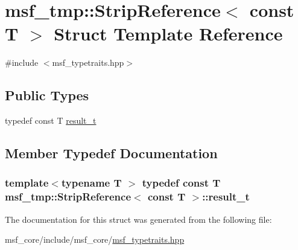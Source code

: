 \hypertarget{structmsf__tmp_1_1StripReference_3_01const_01T_01_4}{\section{msf\-\_\-tmp\-:\-:Strip\-Reference$<$ const T $>$ Struct Template Reference}
\label{structmsf__tmp_1_1StripReference_3_01const_01T_01_4}
}


{\ttfamily \#include $<$msf\-\_\-typetraits.\-hpp$>$}

\subsection*{Public Types}
\begin{DoxyCompactItemize}
\item 
typedef const T \hyperlink{structmsf__tmp_1_1StripReference_3_01const_01T_01_4_a4aa9040c1a950280fc8a134e0f7b6e4a}{result\-\_\-t}
\end{DoxyCompactItemize}


\subsection{Member Typedef Documentation}
\hypertarget{structmsf__tmp_1_1StripReference_3_01const_01T_01_4_a4aa9040c1a950280fc8a134e0f7b6e4a}{
\subsubsection[{result\-\_\-t}]{\setlength{\rightskip}{0pt plus 5cm}template$<$typename T $>$ typedef const T {\bf msf\-\_\-tmp\-::\-Strip\-Reference}$<$ const T $>$\-::{\bf result\-\_\-t}}}\label{structmsf__tmp_1_1StripReference_3_01const_01T_01_4_a4aa9040c1a950280fc8a134e0f7b6e4a}


The documentation for this struct was generated from the following file\-:\begin{DoxyCompactItemize}
\item 
msf\-\_\-core/include/msf\-\_\-core/\hyperlink{msf__typetraits_8hpp}{msf\-\_\-typetraits.\-hpp}\end{DoxyCompactItemize}
